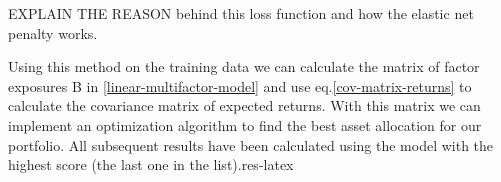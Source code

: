 EXPLAIN THE REASON behind this loss function and how the elastic net penalty works.

Using this method on the training data we can calculate the matrix of factor exposures B in \eqref{linear-multifactor-model} and use eq.\eqref{cov-matrix-returns} to calculate the covariance matrix of expected returns. With this matrix we can implement an optimization algorithm to find the best asset allocation for our portfolio.
All subsequent results have been calculated using the model with the highest score (the last one in the list).res-latex

